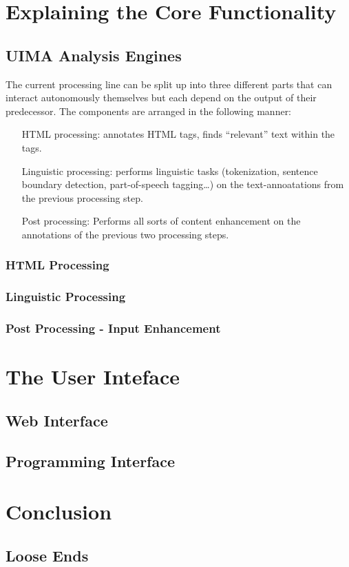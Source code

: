 \documentclass{article}
\begin{document}
\section{Explaining the Core Functionality}

\subsection{UIMA Analysis Engines}

The current processing line can be split up into three different parts that can
interact autonomously themselves but each depend on the output of their
predecessor. The components are arranged in the following manner:

\begin{itemize}

\item[HTML processing:] annotates HTML tags, finds ``relevant'' text within the
tags.

\item[Linguistic processing:] performs linguistic tasks (tokenization, sentence
boundary detection, part-of-speech tagging\ldots{}) on the text-annoatations
from the previous processing step.

\item[Post processing:] Performs all sorts of content enhancement on the
annotations of the previous two processing steps.

\end{itemize}

\subsubsection{HTML Processing}

\subsubsection{Linguistic Processing}

\subsubsection{Post Processing - Input Enhancement}

\section{The User Inteface}

\subsection{Web Interface}

\subsection{Programming Interface}

\section{Conclusion}

\subsection{Loose Ends}
\end{document}
